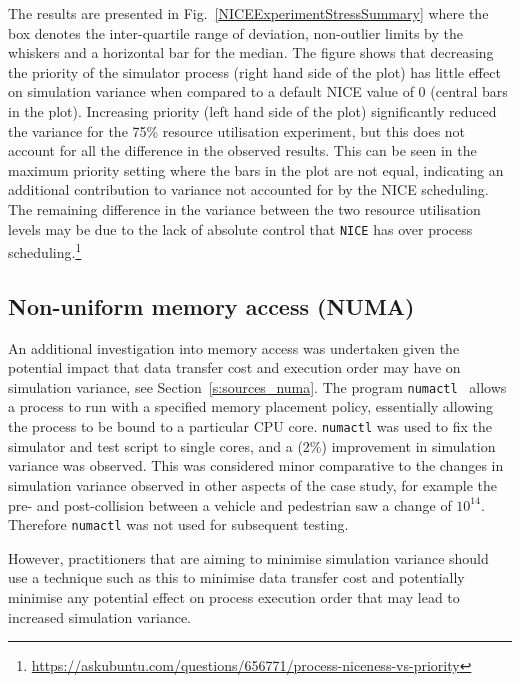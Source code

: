 The results are presented in Fig.~\ref{NICEExperimentStressSummary} where the box denotes the inter-quartile range of deviation, non-outlier limits by the whiskers and a horizontal bar for the median. The figure shows that decreasing the priority of the simulator process (right hand side of the  plot) has little effect on simulation variance when compared to a default NICE value of 0 (central bars in the plot). Increasing priority (left hand side of the plot) significantly reduced the variance for the 75\% resource utilisation experiment, but this does not account for all the difference in the observed results. This can be seen in the maximum priority setting where the bars in the plot are not equal, indicating an additional contribution to variance not accounted for by the NICE scheduling. 
%
The remaining difference in the variance between the two resource utilisation levels may be due to the lack of absolute control that \texttt{NICE} has over process scheduling.\footnote{\url{https://askubuntu.com/questions/656771/process-niceness-vs-priority}}

\subsection{Non-uniform memory access (NUMA)} \label{r:numa}
An additional investigation into memory access was undertaken given the potential impact that data transfer cost and execution order may have on simulation variance, see Section~\ref{s:sources_numa}. %
The program \texttt{numactl}~\cite{numactl_NUMA} allows a process to run with a specified memory placement policy, essentially allowing the process to be bound to a particular CPU core. %
\texttt{numactl} was used to fix the simulator and test script to single cores, and a (2\%) improvement in simulation variance was observed. %
This was considered minor comparative to the changes in simulation variance observed in other aspects of the case study, for example the pre- and post-collision between a vehicle and pedestrian saw a change of $10^{14}$. Therefore \texttt{numactl} was not used for subsequent testing.

However, practitioners that are aiming to minimise simulation variance should use a technique such as this to minimise data transfer cost and potentially minimise any potential effect on process execution order that may lead to increased simulation variance. 


